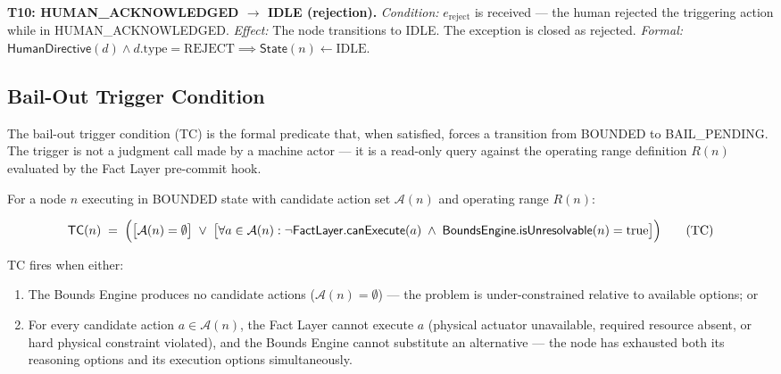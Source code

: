 \bigskip
\noindent\textbf{T10: HUMAN\_ACKNOWLEDGED $\rightarrow$ IDLE (rejection).} \emph{Condition:} $e_{\text{reject}}$ is received — the human rejected the triggering action while in HUMAN\_ACKNOWLEDGED. \emph{Effect:} The node transitions to IDLE. The exception is closed as rejected. \emph{Formal:} $\mathsf{HumanDirective}(d) \land d.\text{type} = \text{REJECT} \implies \mathsf{State}(n) \leftarrow \text{IDLE}$.

\subsection{Bail-Out Trigger Condition}
\label{sec:bailout-trigger}

The bail-out trigger condition (TC) is the formal predicate that, when satisfied, forces a transition from BOUNDED to BAIL\_PENDING. The trigger is not a judgment call made by a machine actor — it is a read-only query against the operating range definition $R(n)$ evaluated by the Fact Layer pre-commit hook.

\begin{definition}
\label{def:bailout-trigger}
For a node $n$ executing in BOUNDED state with candidate action set $\mathcal{A}(n)$ and operating range $R(n)$:

\[
\mathsf{TC}(n) \;=\; \Bigl( \bigl[ \mathcal{A}(n) = \emptyset \bigr] \;\lor\; \bigl[ \forall a \in \mathcal{A}(n): \neg\mathsf{FactLayer.canExecute}(a) \;\land\; \mathsf{BoundsEngine.isUnresolvable}(n) = \text{true} \bigr] \Bigr)
\tag{TC}
\]

TC fires when either:

\begin{enumerate}
\item The Bounds Engine produces no candidate actions ($\mathcal{A}(n) = \emptyset$) — the problem is under-constrained relative to available options; or
\item For every candidate action $a \in \mathcal{A}(n)$, the Fact Layer cannot execute $a$ (physical actuator unavailable, required resource absent, or hard physical constraint violated), and the Bounds Engine cannot substitute an alternative — the node has exhausted both its reasoning options and its execution options simultaneously.
\end{enumerate}
\end{definition}

